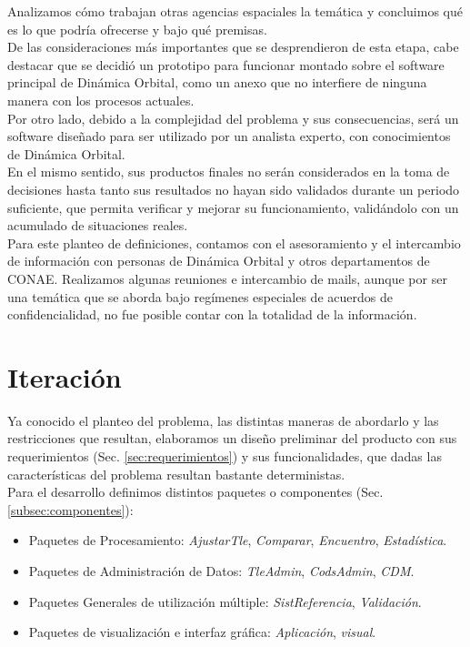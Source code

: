 Analizamos c\'omo trabajan otras agencias espaciales la tem\'atica y concluimos qu\'e es lo que podr\'ia ofrecerse y bajo qu\'e premisas.\\
De las consideraciones m\'as importantes que se desprendieron de esta etapa, cabe destacar que se decidi\'o un prototipo para funcionar montado sobre el software principal de Din\'amica Orbital, como un anexo que no interfiere de ninguna manera con los procesos actuales.\\
Por otro lado, debido a la complejidad del problema y sus consecuencias, ser\'a un software diseñado para ser utilizado por un analista experto, con conocimientos de Din\'amica Orbital.\\
En el mismo sentido, sus productos finales no ser\'an considerados en la toma de decisiones hasta tanto sus resultados no hayan sido validados durante un periodo suficiente, que permita verificar y mejorar su funcionamiento, valid\'andolo con un acumulado de situaciones reales.\\

Para este planteo de definiciones, contamos con el asesoramiento y el intercambio de informaci\'on con personas de Din\'amica Orbital y otros departamentos de CONAE. Realizamos algunas reuniones e intercambio de mails, aunque por ser una tem\'atica que se aborda bajo reg\'imenes especiales de acuerdos de confidencialidad, no fue posible contar con la totalidad de la informaci\'on.

\section{Iteraci\'on}
Ya conocido el planteo del problema, las distintas maneras de abordarlo y las restricciones que resultan, elaboramos un diseño preliminar del producto con sus requerimientos (Sec. \ref{sec:requerimientos}) y sus funcionalidades, que dadas las caracter\'isticas del problema resultan bastante deterministas.\\

Para el desarrollo definimos distintos paquetes o componentes (Sec. \ref{subsec:componentes}):\\

\begin{itemize}
\itemsep0em
 \item Paquetes de Procesamiento: {\it{AjustarTle}}, {\it{Comparar}}, {\it{Encuentro}}, {\it{Estad\'istica}}.
 \item Paquetes de Administraci\'on de Datos: {\it{TleAdmin}}, {\it{CodsAdmin}}, {\it{CDM}}.
 \item Paquetes Generales de utilizaci\'on m\'ultiple: {\it{SistReferencia}}, {\it{Validaci\'on}}.
 \item Paquetes de visualizaci\'on e interfaz gr\'afica: {\it{Aplicaci\'on}}, {\it{visual}}.
\end{itemize}

